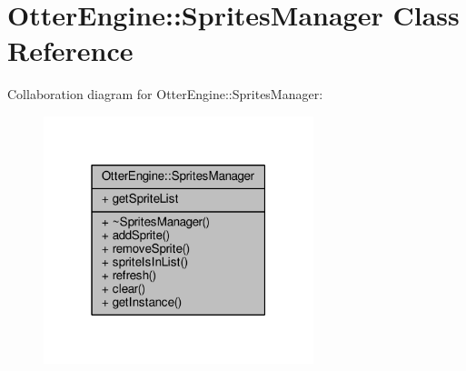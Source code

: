 \hypertarget{class_otter_engine_1_1_sprites_manager}{}\section{Otter\+Engine\+:\+:Sprites\+Manager Class Reference}
\label{class_otter_engine_1_1_sprites_manager}


Collaboration diagram for Otter\+Engine\+:\+:Sprites\+Manager\+:\nopagebreak
\begin{figure}[H]
\begin{center}
\leavevmode
\includegraphics[width=223pt]{db/d3a/class_otter_engine_1_1_sprites_manager__coll__graph}
\end{center}
\end{figure}

